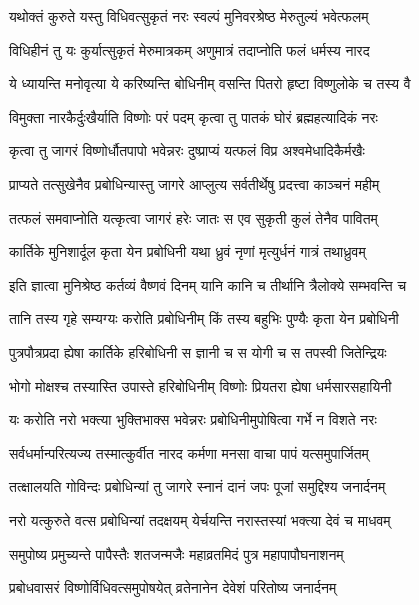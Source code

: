 \twolineshloka
{यथोक्तं कुरुते यस्तु विधिवत्सुकृतं नरः}
{स्वल्पं मुनिवरश्रेष्ठ मेरुतुल्यं भवेत्फलम्}%

\twolineshloka
{विधिहीनं तु यः कुर्यात्सुकृतं मेरुमात्रकम्}
{अणुमात्रं तदाप्नोति फलं धर्मस्य नारद}%

\twolineshloka
{ये ध्यायन्ति मनोवृत्या ये करिष्यन्ति बोधिनीम्}
{वसन्ति पितरो हृष्टा विष्णुलोके च तस्य वै}%

\twolineshloka
{विमुक्ता नारकैर्दुःखैर्याति विष्णोः परं पदम्}
{कृत्वा तु पातकं घोरं ब्रह्महत्यादिकं नरः}%

\twolineshloka
{कृत्वा तु जागरं विष्णोर्धौतपापो भवेन्नरः}
{दुष्प्राप्यं यत्फलं विप्र अश्वमेधादिकैर्मखैः}%

\twolineshloka
{प्राप्यते तत्सुखेनैव प्रबोधिन्यास्तु जागरे}
{आप्लुत्य सर्वतीर्थेषु प्रदत्त्वा काञ्चनं महीम्}%

\twolineshloka
{तत्फलं समवाप्नोति यत्कृत्वा जागरं हरेः}
{जातः स एव सुकृती कुलं तेनैव पावितम्}%

\twolineshloka
{कार्तिके मुनिशार्दूल कृता येन प्रबोधिनी}
{यथा ध्रुवं नृणां मृत्युर्धनं गात्रं तथाध्रुवम्}%

\twolineshloka
{इति ज्ञात्वा मुनिश्रेष्ठ कर्तव्यं वैष्णवं दिनम्}
{यानि कानि च तीर्थानि त्रैलोक्ये सम्भवन्ति च}%

\twolineshloka
{तानि तस्य गृहे सम्यग्यः करोति प्रबोधिनीम्}
{किं तस्य बहुभिः पुण्यैः कृता येन प्रबोधिनी}%

\twolineshloka
{पुत्रपौत्रप्रदा ह्येषा कार्तिके हरिबोधिनी}
{स ज्ञानी च स योगी च स तपस्वी जितेन्द्रियः}%

\twolineshloka
{भोगो मोक्षश्च तस्यास्ति उपास्ते हरिबोधिनीम्}
{विष्णोः प्रियतरा ह्येषा धर्मसारसहायिनी}%

\twolineshloka
{यः करोति नरो भक्त्या भुक्तिभाक्स भवेन्नरः}
{प्रबोधिनीमुपोषित्वा गर्भे न विशते नरः}%

\twolineshloka
{सर्वधर्मान्परित्यज्य तस्मात्कुर्वीत नारद}
{कर्मणा मनसा वाचा पापं यत्समुपार्जितम्}%

\twolineshloka
{तत्क्षालयति गोविन्दः प्रबोधिन्यां तु जागरे}
{स्नानं दानं जपः पूजां समुद्दिश्य जनार्दनम्}%

\twolineshloka
{नरो यत्कुरुते वत्स प्रबोधिन्यां तदक्षयम्}
{येर्चयन्ति नरास्तस्यां भक्त्या देवं च माधवम्}%

\twolineshloka
{समुपोष्य प्रमुच्यन्ते पापैस्तैः शतजन्मजैः}
{महाव्रतमिदं पुत्र महापापौघनाशनम्}%

\twolineshloka
{प्रबोधवासरं विष्णोर्विधिवत्समुपोषयेत्}
{व्रतेनानेन देवेशं परितोष्य जनार्दनम्}%

